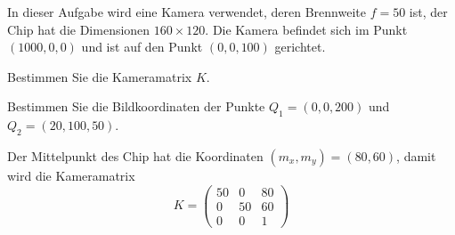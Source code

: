 In dieser Aufgabe wird eine Kamera verwendet, deren Brennweite $f=50$ ist,
der Chip hat die Dimensionen $160\times 120$.
Die Kamera befindet sich im Punkt $(1000,0,0)$ und ist auf den Punkt
$(0,0,100)$ gerichtet.
\begin{teilaufgaben}
\item Bestimmen Sie die Kameramatrix $K$.
\item Bestimmen Sie die Bildkoordinaten der Punkte
$Q_1=(0,0,200)$ und $Q_2=(20,100,50)$.
\end{teilaufgaben}


\begin{loesung}
\begin{teilaufgaben}
\item Der Mittelpunkt des Chip hat die Koordinaten $(m_x,m_y)=(80,60)$,
damit wird die Kameramatrix
\[
K=\begin{pmatrix}
50& 0&80\\
 0&50&60\\
 0& 0& 1
\end{pmatrix}
\]
\end{teilaufgaben}
\end{loesung}
